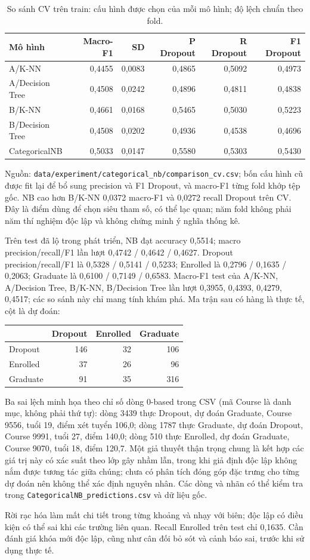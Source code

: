 \begin{table}[htbp]\centering\small
\caption{So sánh CV trên train: cấu hình được chọn của mỗi mô hình; độ lệch chuẩn theo fold.}\label{tab:nb-cv}
\begin{tabular}{lrrrrr}\toprule
Mô hình & Macro-F1 & SD & P Dropout & R Dropout & F1 Dropout\\\midrule
A/K-NN & 0,4455 & 0,0083 & 0,4865 & 0,5092 & 0,4973\\
A/Decision Tree & 0,4508 & 0,0242 & 0,4896 & 0,4811 & 0,4838\\
B/K-NN & 0,4661 & 0,0168 & 0,5465 & 0,5030 & 0,5223\\
B/Decision Tree & 0,4508 & 0,0202 & 0,4936 & 0,4538 & 0,4696\\
CategoricalNB & 0,5033 & 0,0147 & 0,5580 & 0,5303 & 0,5430\\\bottomrule
\end{tabular}\end{table}
Nguồn: \texttt{data/experiment/categorical\_nb/comparison\_cv.csv}; bốn cấu hình cũ được fit lại để bổ sung precision và F1 Dropout, và macro-F1 từng fold khớp tệp gốc. NB cao hơn B/K-NN 0,0372 macro-F1 và 0,0272 recall Dropout trên CV. Đây là điểm dùng để chọn siêu tham số, có thể lạc quan; năm fold không phải năm thí nghiệm độc lập và không chứng minh ý nghĩa thống kê.

Trên test đã lộ trong phát triển, NB đạt accuracy 0,5514; macro precision/recall/F1 lần lượt 0,4742 / 0,4642 / 0,4627. Dropout precision/recall/F1 là 0,5328 / 0,5141 / 0,5233; Enrolled là 0,2796 / 0,1635 / 0,2063; Graduate là 0,6100 / 0,7149 / 0,6583. Macro-F1 test của A/K-NN, A/Decision Tree, B/K-NN, B/Decision Tree lần lượt 0,3955, 0,4393, 0,4279, 0,4517; các so sánh này chỉ mang tính khám phá. Ma trận sau có hàng là thực tế, cột là dự đoán:
\begin{center}\begin{tabular}{lrrr}\toprule
 & Dropout & Enrolled & Graduate\\\midrule
Dropout & 146 & 32 & 106\\
Enrolled & 37 & 26 & 96\\
Graduate & 91 & 35 & 316\\\bottomrule
\end{tabular}\end{center}

Ba sai lệch minh họa theo chỉ số dòng 0-based trong CSV (mã Course là danh mục, không phải thứ tự): dòng 3439 thực Dropout, dự đoán Graduate, Course 9556, tuổi 19, điểm xét tuyển 106,0; dòng 1787 thực Graduate, dự đoán Dropout, Course 9991, tuổi 27, điểm 140,0; dòng 510 thực Enrolled, dự đoán Graduate, Course 9070, tuổi 18, điểm 120,7. Một giả thuyết thận trọng chung là kết hợp các giá trị này có xác suất theo lớp gây nhầm lẫn, trong khi giả định độc lập không nắm được tương tác giữa chúng; chưa có phân tích đóng góp đặc trưng cho từng dự đoán nên không thể xác định nguyên nhân. Các dòng và nhãn có thể kiểm tra trong \texttt{CategoricalNB\_predictions.csv} và dữ liệu gốc.

Rời rạc hóa làm mất chi tiết trong từng khoảng và nhạy với biên; độc lập có điều kiện có thể sai khi các trường liên quan. Recall Enrolled trên test chỉ 0,1635. Cần đánh giá khóa mới độc lập, cũng như cân đối bỏ sót và cảnh báo sai, trước khi sử dụng thực tế.
